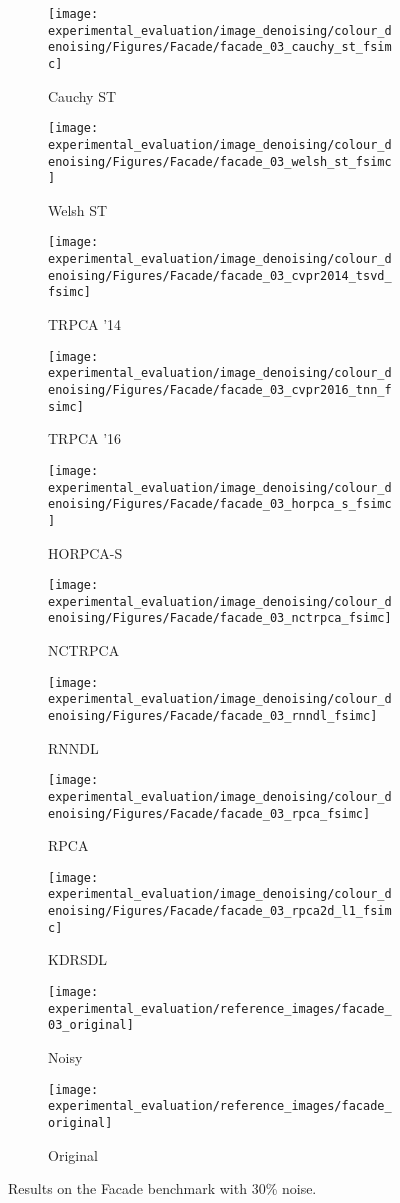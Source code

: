 \begin{figure}
\captionsetup[sub]{font=scriptsize}
\begin{subfigure}[b]{.19\linewidth}
\texttt{[image: experimental\_evaluation/image\_denoising/colour\_denoising/Figures/Facade/facade\_03\_cauchy\_st\_fsimc]} 
\caption{Cauchy ST}
\end{subfigure}\hfill
\begin{subfigure}[b]{.19\linewidth}
\texttt{[image: experimental\_evaluation/image\_denoising/colour\_denoising/Figures/Facade/facade\_03\_welsh\_st\_fsimc]} 
\caption{Welsh ST}
\end{subfigure}\hfill
\begin{subfigure}[b]{.19\linewidth}
\texttt{[image: experimental\_evaluation/image\_denoising/colour\_denoising/Figures/Facade/facade\_03\_cvpr2014\_tsvd\_fsimc]} 
\caption{TRPCA '14}
\end{subfigure}\hfill
\begin{subfigure}[b]{.19\linewidth}
\texttt{[image: experimental\_evaluation/image\_denoising/colour\_denoising/Figures/Facade/facade\_03\_cvpr2016\_tnn\_fsimc]}
\caption{TRPCA '16}
\end{subfigure}\hfill
\begin{subfigure}[b]{.19\linewidth}
\texttt{[image: experimental\_evaluation/image\_denoising/colour\_denoising/Figures/Facade/facade\_03\_horpca\_s\_fsimc]} 
\caption{HORPCA-S}
\end{subfigure}\hfill
\begin{subfigure}[b]{.19\linewidth}
\texttt{[image: experimental\_evaluation/image\_denoising/colour\_denoising/Figures/Facade/facade\_03\_nctrpca\_fsimc]} 
\caption{NCTRPCA}
\end{subfigure}\hfill
\begin{subfigure}[b]{.19\linewidth}
\texttt{[image: experimental\_evaluation/image\_denoising/colour\_denoising/Figures/Facade/facade\_03\_rnndl\_fsimc]} 
\caption{RNNDL}
\end{subfigure}\hfill
\begin{subfigure}[b]{.19\linewidth}
\texttt{[image: experimental\_evaluation/image\_denoising/colour\_denoising/Figures/Facade/facade\_03\_rpca\_fsimc]} 
\caption{RPCA}
\end{subfigure}\hfill
\begin{subfigure}[b]{.19\linewidth}
\texttt{[image: experimental\_evaluation/image\_denoising/colour\_denoising/Figures/Facade/facade\_03\_rpca2d\_l1\_fsimc]}
\caption{KDRSDL}
\end{subfigure}
\begin{subfigure}[b]{.19\linewidth}
\texttt{[image: experimental\_evaluation/reference\_images/facade\_03\_original]}
\caption{Noisy}
\end{subfigure}
\begin{subfigure}[b]{.19\linewidth}
\texttt{[image: experimental\_evaluation/reference\_images/facade\_original]} 
\caption{Original}
\end{subfigure}
\caption{Results on the Facade benchmark with 30\% noise.}
\label{fig:visual_facade_30}
\end{figure}
